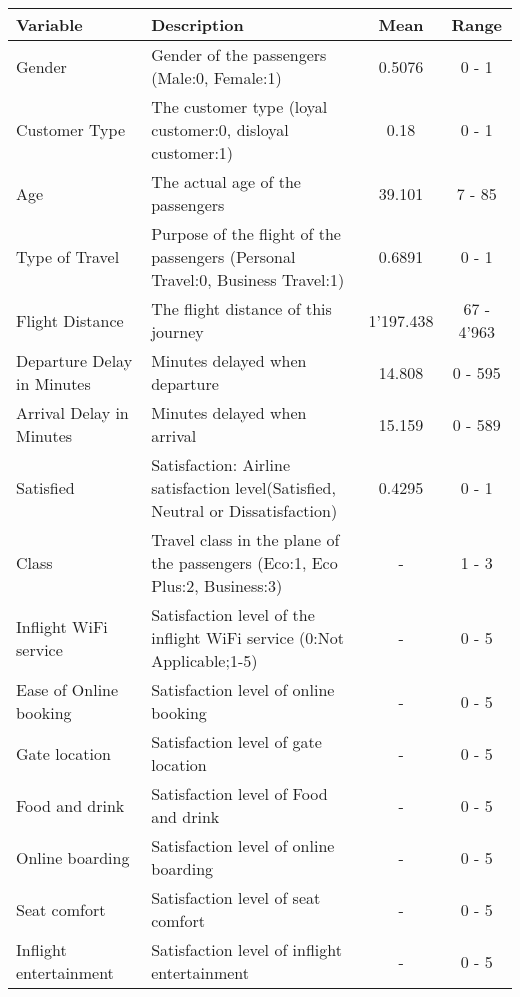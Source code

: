   \begin{landscape}
  \pagestyle{empty}
  \begin{table}[h]
    \centering
    \begin{tabular}{|l|L|c|c|}
      \hline
      \textbf{Variable} & \textbf{Description} & \textbf{Mean} & \textbf{Range} \\
      \hline
      Gender & Gender of the passengers (Male:0, Female:1) & 0.5076 & 0 - 1
      \\\hline 
      Customer Type & The customer type (loyal customer:0, disloyal customer:1) 
      & 0.18 & 0 - 1 \\\hline
      Age & The actual age of the passengers & 39.101 & 7 - 85 \\\hline
      Type of Travel & Purpose of the flight of the passengers
      (Personal Travel:0, Business Travel:1) & 0.6891 & 0 - 1 \\\hline
      Flight Distance & The flight distance of this journey &
      1'197.438 & 67 - 4'963 \\\hline
      Departure Delay in Minutes & Minutes delayed when departure & 14.808 & 0 - 595 \\\hline
      Arrival Delay in Minutes & Minutes delayed when arrival & 15.159 & 0 -
      589 \\\hline
      Satisfied & Satisfaction: Airline satisfaction level(Satisfied, 
      Neutral or Dissatisfaction) & 0.4295 & 0 - 1 \\\hline
      Class & Travel class in the plane of the passengers (Eco:1, Eco Plus:2, 
      Business:3) & - & 1 - 3 \\\hline
      Inflight WiFi service & Satisfaction level of the inflight WiFi service
      (0:Not Applicable;1-5) & - & 0 - 5 \\\hline
      Ease of Online booking & Satisfaction level of online booking & - & 0 - 5
      \\\hline
      Gate location & Satisfaction level of gate location & - & 0 - 5 \\\hline
      Food and drink & Satisfaction level of Food and drink & - & 0 - 5
      \\\hline
      Online boarding & Satisfaction level of online boarding & - & 0 - 5
      \\\hline
      Seat comfort & Satisfaction level of seat comfort & - & 0 - 5 \\\hline
      Inflight entertainment & Satisfaction level of inflight entertainment & -
                             & 0 - 5 \\\hline

\end{tabular}
\end{table}
\end{landscape}
